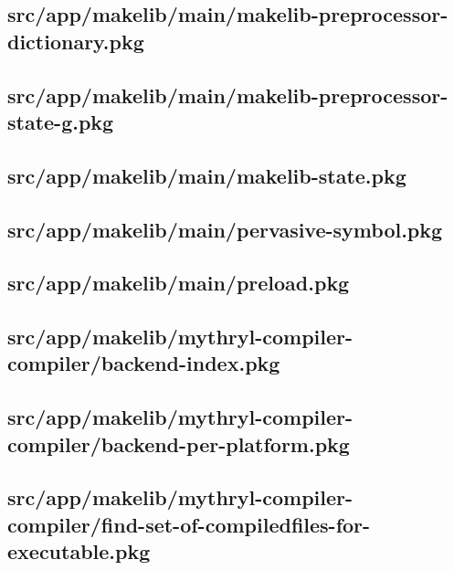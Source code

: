\subsection{src/app/makelib/main/makelib-preprocessor-dictionary.pkg}


\subsection{src/app/makelib/main/makelib-preprocessor-state-g.pkg}


\subsection{src/app/makelib/main/makelib-state.pkg}


\subsection{src/app/makelib/main/pervasive-symbol.pkg}


\subsection{src/app/makelib/main/preload.pkg}


\subsection{src/app/makelib/mythryl-compiler-compiler/backend-index.pkg}


\subsection{src/app/makelib/mythryl-compiler-compiler/backend-per-platform.pkg}


\subsection{src/app/makelib/mythryl-compiler-compiler/find-set-of-compiledfiles-for-executable.pkg}


